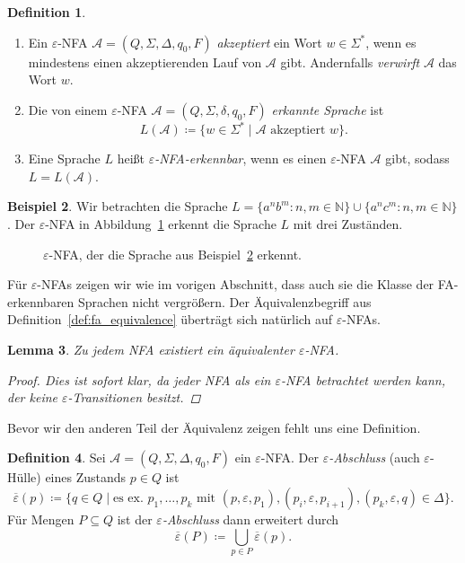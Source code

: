 \documentclass[11pt, a4paper]{article}
\theoremstyle{definition}
\newtheorem{definition}{Definition}[section]
\newtheorem{example}[definition]{Beispiel}
\theoremstyle{plain}
\newtheorem{lemma}[definition]{Lemma}
\numberwithin{equation}{section}
\newcommand{\comp}[1]{\overline{#1}}
\begin{document}
\begin{definition}
\
	\begin{enumerate}
		\item Ein $\varepsilon$-NFA $\mathcal{A} = (Q, \Sigma, \Delta, q_0, F)$ \textit{akzeptiert} ein Wort $w \in \Sigma^\ast$, wenn es mindestens einen akzeptierenden Lauf von $\mathcal{A}$ gibt. Andernfalls \textit{verwirft} $\mathcal{A}$ das Wort $w$.
		\item Die von einem $\varepsilon$-NFA $\mathcal{A} = (Q, \Sigma, \delta, q_0, F)$ \textit{erkannte Sprache} ist
			$$
				L(\mathcal{A}) \coloneqq \{ w \in \Sigma^\ast \mid \mathcal{A} \text{ akzeptiert } w \}.
			$$
		\item Eine Sprache $L$ heißt \textit{$\varepsilon$-NFA-erkennbar}, wenn es einen $\varepsilon$-NFA $\mathcal{A}$ gibt, sodass $L = L(\mathcal{A})$.
	\end{enumerate}
\end{definition}
\begin{example}\label{exp:ex3}
	Wir betrachten die Sprache $L = \{ a^n b^m : n, m \in \mathbb{N} \} \cup \{ a^n c^m : n, m \in \mathbb{N} \}$. Der $\varepsilon$-NFA in Abbildung~\ref{fig:epsnfa_ex1} erkennt die Sprache $L$ mit drei Zuständen.
\end{example}
\begin{figure}
	\centering
	
	\caption{$\varepsilon$-NFA, der die Sprache aus Beispiel~\ref{exp:ex3} erkennt.}
	\label{fig:epsnfa_ex1}
\end{figure}
Für $\varepsilon$-NFAs zeigen wir wie im vorigen Abschnitt, dass auch sie die Klasse der FA-erkennbaren Sprachen nicht vergrößern. Der Äquivalenzbegriff aus Definition~\ref{def:fa_equivalence} überträgt sich natürlich auf $\varepsilon$-NFAs.
\begin{lemma}
	Zu jedem NFA existiert ein äquivalenter $\varepsilon$-NFA.
	\begin{proof}
		Dies ist sofort klar, da jeder NFA als ein $\varepsilon$-NFA betrachtet werden kann, der keine $\varepsilon$-Transitionen besitzt.
	\end{proof}
\end{lemma}
Bevor wir den anderen Teil der Äquivalenz zeigen fehlt uns eine Definition.
\begin{definition}\label{def:eps_closure}
	Sei $\mathcal{A} = (Q, \Sigma, \Delta, q_0, F)$ ein $\varepsilon$-NFA. Der \textit{$\varepsilon$-Abschluss} (auch $\varepsilon$-Hülle) eines Zustands $p \in Q$ ist
	$$
		\comp{\varepsilon}(p) \coloneqq \{ q \in Q \mid \text{es ex. } p_1, \ldots, p_k \text{ mit } (p, \varepsilon, p_1), (p_i, \varepsilon, p_{i+1}), (p_k, \varepsilon, q) \in \Delta \}.
	$$
	Für Mengen $P \subseteq Q$ ist der \textit{$\varepsilon$-Abschluss} dann erweitert durch
	$$
		\comp{\varepsilon}(P) \coloneqq \bigcup_{p \in P} \comp{\varepsilon}(p).
	$$
\end{definition}
\end{document}
